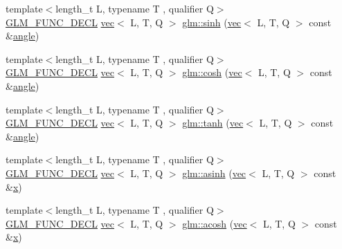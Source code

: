 \begin{DoxyCompactItemize}
\item 
{\footnotesize template$<$length\+\_\+t L, typename T , qualifier Q$>$ }\\\mbox{\hyperlink{setup_8hpp_ab2d052de21a70539923e9bcbf6e83a51}{G\+L\+M\+\_\+\+F\+U\+N\+C\+\_\+\+D\+E\+CL}} \mbox{\hyperlink{structglm_1_1vec}{vec}}$<$ L, T, Q $>$ \mbox{\hyperlink{group__core__func__trigonometric_gac7c39ff21809e281552b4dbe46f4a39d}{glm\+::sinh}} (\mbox{\hyperlink{structglm_1_1vec}{vec}}$<$ L, T, Q $>$ const \&\mbox{\hyperlink{_s_d_l__opengl__glext_8h_a9e06c1f76a20fed54ca742cd25cb02c4}{angle}})
\item 
{\footnotesize template$<$length\+\_\+t L, typename T , qualifier Q$>$ }\\\mbox{\hyperlink{setup_8hpp_ab2d052de21a70539923e9bcbf6e83a51}{G\+L\+M\+\_\+\+F\+U\+N\+C\+\_\+\+D\+E\+CL}} \mbox{\hyperlink{structglm_1_1vec}{vec}}$<$ L, T, Q $>$ \mbox{\hyperlink{group__core__func__trigonometric_ga4e260e372742c5f517aca196cf1e62b3}{glm\+::cosh}} (\mbox{\hyperlink{structglm_1_1vec}{vec}}$<$ L, T, Q $>$ const \&\mbox{\hyperlink{_s_d_l__opengl__glext_8h_a9e06c1f76a20fed54ca742cd25cb02c4}{angle}})
\item 
{\footnotesize template$<$length\+\_\+t L, typename T , qualifier Q$>$ }\\\mbox{\hyperlink{setup_8hpp_ab2d052de21a70539923e9bcbf6e83a51}{G\+L\+M\+\_\+\+F\+U\+N\+C\+\_\+\+D\+E\+CL}} \mbox{\hyperlink{structglm_1_1vec}{vec}}$<$ L, T, Q $>$ \mbox{\hyperlink{group__core__func__trigonometric_gaa1bccbfdcbe40ed2ffcddc2aa8bfd0f1}{glm\+::tanh}} (\mbox{\hyperlink{structglm_1_1vec}{vec}}$<$ L, T, Q $>$ const \&\mbox{\hyperlink{_s_d_l__opengl__glext_8h_a9e06c1f76a20fed54ca742cd25cb02c4}{angle}})
\item 
{\footnotesize template$<$length\+\_\+t L, typename T , qualifier Q$>$ }\\\mbox{\hyperlink{setup_8hpp_ab2d052de21a70539923e9bcbf6e83a51}{G\+L\+M\+\_\+\+F\+U\+N\+C\+\_\+\+D\+E\+CL}} \mbox{\hyperlink{structglm_1_1vec}{vec}}$<$ L, T, Q $>$ \mbox{\hyperlink{group__core__func__trigonometric_ga3ef16b501ee859fddde88e22192a5950}{glm\+::asinh}} (\mbox{\hyperlink{structglm_1_1vec}{vec}}$<$ L, T, Q $>$ const \&\mbox{\hyperlink{_s_d_l__opengl_8h_ad0e63d0edcdbd3d79554076bf309fd47}{x}})
\item 
{\footnotesize template$<$length\+\_\+t L, typename T , qualifier Q$>$ }\\\mbox{\hyperlink{setup_8hpp_ab2d052de21a70539923e9bcbf6e83a51}{G\+L\+M\+\_\+\+F\+U\+N\+C\+\_\+\+D\+E\+CL}} \mbox{\hyperlink{structglm_1_1vec}{vec}}$<$ L, T, Q $>$ \mbox{\hyperlink{group__core__func__trigonometric_ga858f35dc66fd2688f20c52b5f25be76a}{glm\+::acosh}} (\mbox{\hyperlink{structglm_1_1vec}{vec}}$<$ L, T, Q $>$ const \&\mbox{\hyperlink{_s_d_l__opengl_8h_ad0e63d0edcdbd3d79554076bf309fd47}{x}})

\end{DoxyCompactItemize}
